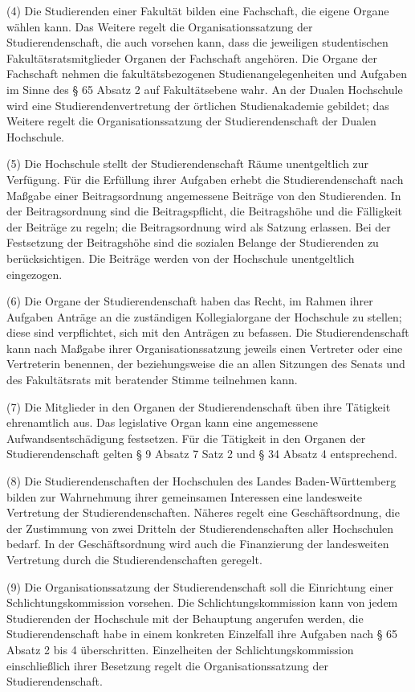 \documentclass[
10pt,
a4paper,
twoside,								%
titlepage=false,							%
draft=false								%
]{scrartcl}
\begin{document}
(4) Die Studierenden einer Fakultät bilden eine Fachschaft, die eigene Organe wählen kann. Das Weitere regelt die Organisationssatzung der Studierendenschaft, die auch vorsehen kann, dass die jeweiligen studentischen Fakultätsratsmitglieder Organen der Fachschaft angehören. Die Organe der Fachschaft nehmen die fakultätsbezogenen Studienangelegenheiten und Aufgaben im Sinne des § 65 Absatz 2 auf Fakultätsebene wahr. An der Dualen Hochschule wird eine Studierendenvertretung der örtlichen Studienakademie gebildet; das Weitere regelt die Organisationssatzung der Studierendenschaft der Dualen Hochschule.

(5) Die Hochschule stellt der Studierendenschaft Räume unentgeltlich zur Verfügung. Für die Erfüllung ihrer Aufgaben erhebt die Studierendenschaft nach Maßgabe einer Beitragsordnung angemessene Beiträge von den Studierenden. In der Beitragsordnung sind die Beitragspflicht, die Beitragshöhe und die Fälligkeit der Beiträge zu regeln; die Beitragsordnung wird als Satzung erlassen. Bei der Festsetzung der Beitragshöhe sind die sozialen Belange der Studierenden zu berücksichtigen. Die Beiträge werden von der Hochschule unentgeltlich eingezogen.

(6) Die Organe der Studierendenschaft haben das Recht, im Rahmen ihrer Aufgaben Anträge an die zuständigen Kollegialorgane der Hochschule zu stellen; diese sind verpflichtet, sich mit den Anträgen zu befassen. Die Studierendenschaft kann nach Maßgabe ihrer Organisationssatzung jeweils einen Vertreter oder eine Vertreterin benennen, der beziehungsweise die an allen Sitzungen des Senats und des Fakultätsrats mit beratender Stimme teilnehmen kann.

(7) Die Mitglieder in den Organen der Studierendenschaft üben ihre Tätigkeit ehrenamtlich aus. Das legislative Organ kann eine angemessene Aufwandsentschädigung festsetzen. Für die Tätigkeit in den Organen der Studierendenschaft gelten § 9 Absatz 7 Satz 2 und § 34 Absatz 4 entsprechend.

(8) Die Studierendenschaften der Hochschulen des Landes Baden-Württemberg bilden zur Wahrnehmung ihrer gemeinsamen Interessen eine landesweite Vertretung der Studierendenschaften. Näheres regelt eine Geschäftsordnung, die der Zustimmung von zwei Dritteln der Studierendenschaften aller Hochschulen bedarf. In der Geschäftsordnung wird auch die Finanzierung der landesweiten Vertretung durch die Studierendenschaften geregelt.

(9) Die Organisationssatzung der Studierendenschaft soll die Einrichtung einer Schlichtungskommission vorsehen. Die Schlichtungskommission kann von jedem Studierenden der Hochschule mit der Behauptung angerufen werden, die Studierendenschaft habe in einem konkreten Einzelfall ihre Aufgaben nach § 65 Absatz 2 bis 4 überschritten. Einzelheiten der Schlichtungskommission einschließlich ihrer Besetzung regelt die Organisationssatzung der Studierendenschaft.
\end{document}
